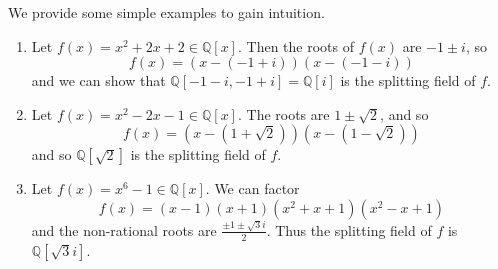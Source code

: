   \begin{example}
    We provide some simple examples to gain intuition. 
    \begin{enumerate}
      \item Let $f(x) = x^2 + 2x + 2 \in \mathbb{Q}[x]$. Then the roots of $f(x)$ are $-1 \pm i$, so 
      \begin{equation}
        f(x) = (x - (-1 + i)) (x - (-1 - i)) 
      \end{equation}
      and we can show that $\mathbb{Q}[-1 - i, -1+i] = \mathbb{Q}[i]$ is the splitting field of $f$. 

      \item Let $f(x) = x^2 - 2x - 1 \in \mathbb{Q}[x]$. The roots are $1 \pm \sqrt{2}$, and so 
      \begin{equation}
        f(x) = (x - (1 + \sqrt{2})) (x - (1 - \sqrt{2}))
      \end{equation}
      and so $\mathbb{Q}[\sqrt{2}]$ is the splitting field of $f$. 

      \item Let $f(x) = x^6 - 1 \in \mathbb{Q}[x]$. We can factor 
        \begin{equation}
          f(x) = (x-1) (x + 1) (x^2 + x + 1) (x^2 - x + 1)
        \end{equation} 
        and the non-rational roots are $\frac{\pm 1 \pm \sqrt{3} i}{2}$. Thus the splitting field of $f$ is $\mathbb{Q}[\sqrt{3} i]$. 
    \end{enumerate}
  \end{example}

